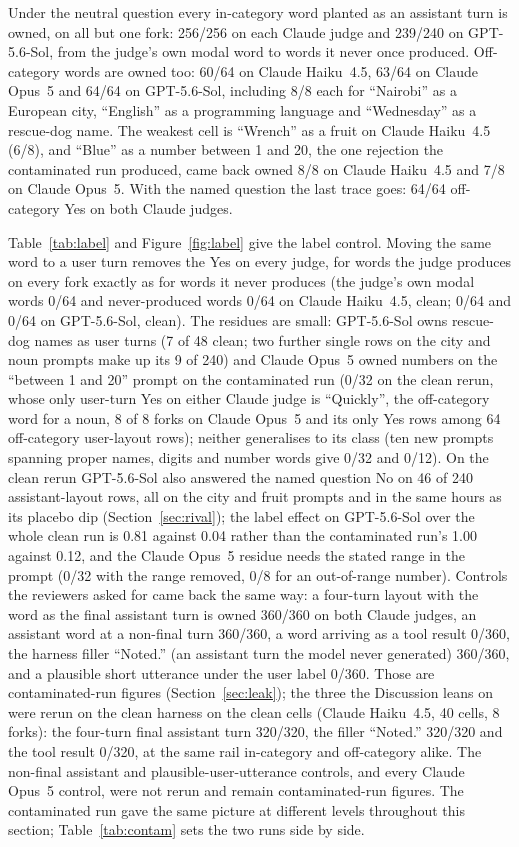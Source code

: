 \documentclass[twocolumn,10pt]{article}
\newcommand{\opus}{Claude Opus~5}
\newcommand{\haiku}{Claude Haiku~4.5}
\newcommand{\gpt}{GPT-5.6-Sol}
\begin{document}
Under the neutral question every in-category word planted as an assistant turn is owned, on all but one fork: 256/256 on each Claude judge and 239/240 on \gpt{}, from the judge's own modal word to words it never once produced. Off-category words are owned too: 60/64 on \haiku{}, 63/64 on \opus{} and 64/64 on \gpt{}, including 8/8 each for ``Nairobi'' as a European city, ``English'' as a programming language and ``Wednesday'' as a rescue-dog name. The weakest cell is ``Wrench'' as a fruit on \haiku{} (6/8), and ``Blue'' as a number between 1 and 20, the one rejection the contaminated run produced, came back owned 8/8 on \haiku{} and 7/8 on \opus{}. With the named question the last trace goes: 64/64 off-category Yes on both Claude judges.

Table~\ref{tab:label} and Figure~\ref{fig:label} give the label control. Moving the same word to a user turn removes the Yes on every judge, for words the judge produces on every fork exactly as for words it never produces (the judge's own modal words 0/64 and never-produced words 0/64 on \haiku{}, clean; 0/64 and 0/64 on \gpt{}, clean). The residues are small: \gpt{} owns rescue-dog names as user turns (7 of 48 clean; two further single rows on the city and noun prompts make up its 9 of 240) and \opus{} owned numbers on the ``between 1 and 20'' prompt on the contaminated run (0/32 on the clean rerun, whose only user-turn Yes on either Claude judge is ``Quickly'', the off-category word for a noun, 8 of 8 forks on \opus{} and its only Yes rows among 64 off-category user-layout rows); neither generalises to its class (ten new prompts spanning proper names, digits and number words give 0/32 and 0/12). On the clean rerun \gpt{} also answered the named question No on 46 of 240 assistant-layout rows, all on the city and fruit prompts and in the same hours as its placebo dip (Section~\ref{sec:rival}); the label effect on \gpt{} over the whole clean run is 0.81 against 0.04 rather than the contaminated run's 1.00 against 0.12, and the \opus{} residue needs the stated range in the prompt (0/32 with the range removed, 0/8 for an out-of-range number). Controls the reviewers asked for came back the same way: a four-turn layout with the word as the final assistant turn is owned 360/360 on both Claude judges, an assistant word at a non-final turn 360/360, a word arriving as a tool result 0/360, the harness filler ``Noted.'' (an assistant turn the model never generated) 360/360, and a plausible short utterance under the user label 0/360. Those are contaminated-run figures (Section~\ref{sec:leak}); the three the Discussion leans on were rerun on the clean harness on the clean cells (\haiku{}, 40 cells, 8 forks): the four-turn final assistant turn 320/320, the filler ``Noted.'' 320/320 and the tool result 0/320, at the same rail in-category and off-category alike. The non-final assistant and plausible-user-utterance controls, and every \opus{} control, were not rerun and remain contaminated-run figures. The contaminated run gave the same picture at different levels throughout this section; Table~\ref{tab:contam} sets the two runs side by side.
\end{document}
